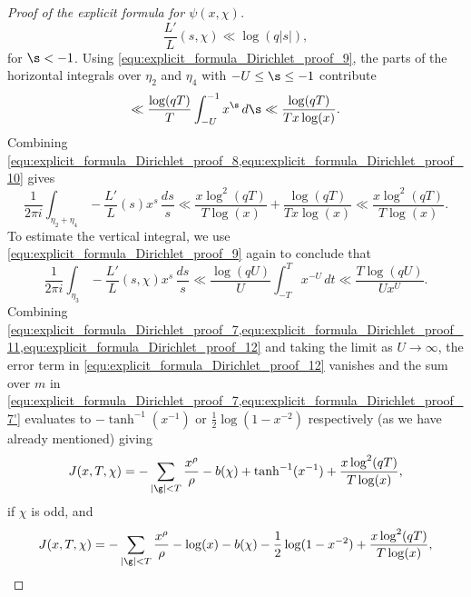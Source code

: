\begin{proof}[Proof of the explicit formula for $\psi(x,\chi)$]
      \begin{equation}\label{equ:explicit_formula_Dirichlet_proof_9}
        \frac{L'}{L}(s,\chi) \ll \log(q|s|),
      \end{equation}
      for $\s < -1$. Using \cref{equ:explicit_formula_Dirichlet_proof_9}, the parts of the horizontal integrals over $\eta_{2}$ and $\eta_{4}$ with $-U \le \s \le -1$ contribute
      \begin{equation}\label{equ:explicit_formula_Dirichlet_proof_10}
        \ll \frac{\log(qT)}{T}\int_{-U}^{-1}x^{\s}\,d\s \ll \frac{\log(qT)}{Tx\log(x)}.
      \end{equation}
      Combining \cref{equ:explicit_formula_Dirichlet_proof_8,equ:explicit_formula_Dirichlet_proof_10} gives
      \begin{equation}\label{equ:explicit_formula_Dirichlet_proof_11}
        \frac{1}{2\pi i}\int_{\eta_{2}+\eta_{4}}-\frac{L'}{L}(s)x^{s}\,\frac{ds}{s} \ll \frac{x\log^{2}(qT)}{T\log(x)}+\frac{\log(qT)}{Tx\log(x)} \ll \frac{x\log^{2}(qT)}{T\log(x)}.
      \end{equation}
      To estimate the vertical integral, we use \cref{equ:explicit_formula_Dirichlet_proof_9} again to conclude that
      \begin{equation}\label{equ:explicit_formula_Dirichlet_proof_12}
        \frac{1}{2\pi i}\int_{\eta_{3}}-\frac{L'}{L}(s,\chi)x^{s}\,\frac{ds}{s} \ll \frac{\log(qU)}{U}\int_{-T}^{T}x^{-U}\,dt \ll \frac{T\log(qU)}{Ux^{U}}.
      \end{equation}
      Combining \cref{equ:explicit_formula_Dirichlet_proof_7,equ:explicit_formula_Dirichlet_proof_11,equ:explicit_formula_Dirichlet_proof_12} and taking the limit as $U \to \infty$, the error term in \cref{equ:explicit_formula_Dirichlet_proof_12} vanishes and the sum over $m$ in \cref{equ:explicit_formula_Dirichlet_proof_7,equ:explicit_formula_Dirichlet_proof_7'} evaluates to $-\tanh^{-1}(x^{-1})$ or $\frac{1}{2}\log(1-x^{-2})$ respectively (as we have already mentioned) giving
      \begin{equation}\label{equ:explicit_formula_Dirichlet_proof_13}
        J(x,T,\chi) = -\sum_{|\g| < T}\frac{x^{\rho}}{\rho}-b(\chi)+\tanh^{-1}(x^{-1})+\frac{x\log^{2}(qT)}{T\log(x)},
      \end{equation}
      if $\chi$ is odd, and
      \begin{equation}\label{equ:explicit_formula_Dirichlet_proof_13'}
        J(x,T,\chi) = -\sum_{|\g| < T}\frac{x^{\rho}}{\rho}-\log(x)-b(\chi)-\frac{1}{2}\log(1-x^{-2})+\frac{x\log^{2}(qT)}{T\log(x)},

\end{equation}
\end{proof}
